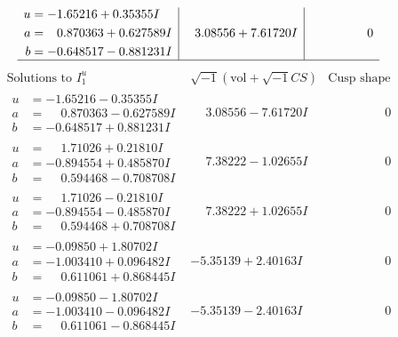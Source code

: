 \documentclass[1p]{elsarticle_modified}
\theoremstyle{definition}
\newcommand{\I}{\sqrt{-1}}
\begin{document}
$$\begin{array}{c|c|c}
\begin{aligned}
u &= -1.65216 + 0.35355 I \\
a &= \phantom{-}0.870363 + 0.627589 I \\
b &= -0.648517 - 0.881231 I\end{aligned}
 & \phantom{-}3.08556 + 7.61720 I & \phantom{-0.000000 } 0\\
 \hline 
 \end{array}$$\newpage$$\begin{array}{c|c|c}  
\text{Solutions to }I^u_{1}& \I (\text{vol} + \sqrt{-1}CS) & \text{Cusp shape}\\
 \hline 
\begin{aligned}
u &= -1.65216 - 0.35355 I \\
a &= \phantom{-}0.870363 - 0.627589 I \\
b &= -0.648517 + 0.881231 I\end{aligned}
 & \phantom{-}3.08556 - 7.61720 I & \phantom{-0.000000 } 0 \\ \hline\begin{aligned}
u &= \phantom{-}1.71026 + 0.21810 I \\
a &= -0.894554 + 0.485870 I \\
b &= \phantom{-}0.594468 - 0.708708 I\end{aligned}
 & \phantom{-}7.38222 - 1.02655 I & \phantom{-0.000000 } 0 \\ \hline\begin{aligned}
u &= \phantom{-}1.71026 - 0.21810 I \\
a &= -0.894554 - 0.485870 I \\
b &= \phantom{-}0.594468 + 0.708708 I\end{aligned}
 & \phantom{-}7.38222 + 1.02655 I & \phantom{-0.000000 } 0 \\ \hline\begin{aligned}
u &= -0.09850 + 1.80702 I \\
a &= -1.003410 + 0.096482 I \\
b &= \phantom{-}0.611061 + 0.868445 I\end{aligned}
 & -5.35139 + 2.40163 I & \phantom{-0.000000 } 0 \\ \hline\begin{aligned}
u &= -0.09850 - 1.80702 I \\
a &= -1.003410 - 0.096482 I \\
b &= \phantom{-}0.611061 - 0.868445 I\end{aligned}
 & -5.35139 - 2.40163 I & \phantom{-0.000000 } 0 \\ \hline\begin{aligned}

\end{aligned}
\end{array}$$
\end{document}
